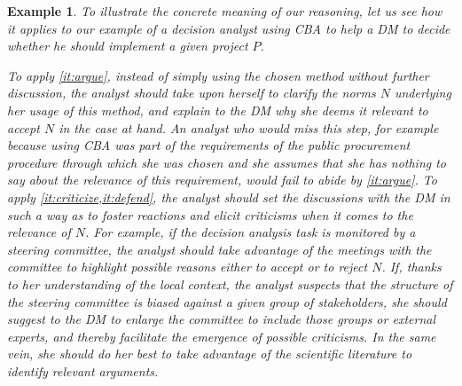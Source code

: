 \documentclass[preprint, french, english, 11pt, authoryear]{elsarticle}%
\newtheorem{example}{Example}
\begin{document}
\begin{example}
To illustrate the concrete meaning of our reasoning, let us see how it applies to our example of a decision analyst using CBA%
 to help a DM%
  to decide whether he should implement a given project $P$.

To apply \cref{it:argue}, instead of simply using the chosen method without further discussion, the analyst should take upon herself to clarify the norms $N$ underlying her usage of this method, and explain to the DM%
 why she deems it relevant to accept $N$ in the case at hand.
An analyst who would miss this step, for example because using CBA%
 was part of the requirements of the public procurement procedure through which she was chosen and she assumes that she has nothing to say about the relevance of this requirement, would fail to abide by \cref{it:argue}.
To apply \cref{it:criticize,it:defend}, the analyst should set the discussions with the DM%
 in such a way as to foster reactions and elicit criticisms when it comes to the relevance of $N$.
For example, if the decision analysis task is monitored by a steering committee, the analyst should take advantage of the meetings with the committee to highlight possible reasons either to accept or to reject $N$.
If, thanks to her understanding of the local context, the analyst suspects that the structure of the steering committee is biased against a given group of stakeholders, she should suggest to the DM%
 to enlarge the committee to include those groups or external experts, 
and thereby facilitate the emergence of possible criticisms.
In the same vein, she should do her best to take advantage of the scientific literature to identify relevant arguments.  




\end{example}
\end{document}
